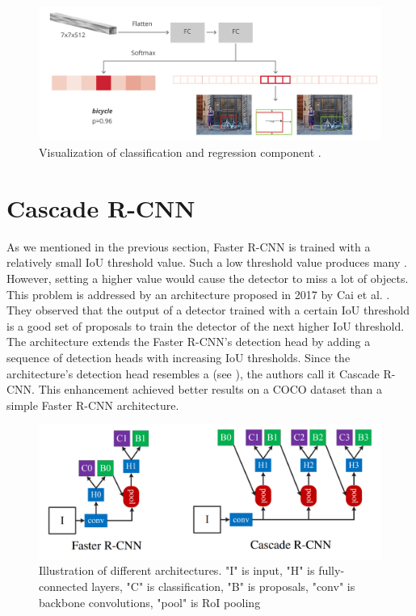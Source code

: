 \begin{figure}[h]
    \centering
    \includegraphics[width=0.95\linewidth]{Sources/Figures/rcnn-architecture.6732b9bd.png}
    \caption{Visualization of classification and regression component \cite{fasterrcnnhead}.}
    \label{fig:rcnn}
\end{figure}

\section{Cascade R-CNN}
As we mentioned in the previous section, Faster R-CNN is trained with a
relatively small IoU threshold value. Such a low threshold value produces many
. However, setting a higher value would cause the detector
to miss a lot of objects. This problem is addressed by an architecture
proposed in 2017 by Cai et al. \cite{cascadercnn}. They observed that the
output of a detector trained with a certain IoU threshold is a good set
of proposals to train the detector of the next higher IoU threshold. The
architecture extends the Faster R-CNN's detection head by adding a sequence
of detection heads with increasing IoU thresholds. Since the architecture's
detection head resembles a  (see ),
the authors call it Cascade R-CNN. This enhancement achieved better results
on a COCO dataset \cite{coco} than a simple Faster R-CNN architecture.

\begin{figure}[h]
    \centering
    \includegraphics[width=0.85\linewidth]{Sources/Figures/cascade.png}
    \caption{Illustration of different architectures. "I" is input, "H" is
        fully-connected layers, "C" is classification, "B" is proposals, "conv" is
        backbone convolutions, "pool" is RoI pooling \cite{cascadercnn}}
    \label{fig:cascade}
\end{figure}

